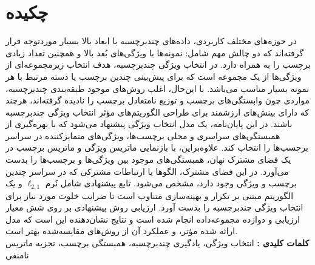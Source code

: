 \thispagestyle{empty}
\BZarboldE\section*{چکیده}
\BNazTTN
در حوزه‌های مختلف کاربردی، داده‌های چندبرچسبه با ابعاد بالا بسیار موردتوجه قرار گرفته‌اند که دو چالش مهم شامل: نمونه‌ها با ویژگی‌های بُعد بالا و همچنین تعداد زیادی برچسب را به همراه دارد. در انتخاب ویژگی چندبرچسبه، هدف انتخاب زیرمجموعه‌ای از ویژگی‌ها از یک مجموعه است که برای پیش‌بینی چندین برچسب یا دسته مرتبط با هر نمونه بسیار مناسب می‌باشد. با این‌حال، اغلب روش‌های موجود طبقه‌بندی چندبرچسبه، مواردی چون وابستگی‌های برچسب و توزیع نامتعادل برچسب را نادیده گرفته‌اند، هرچند که دارای بینش‌های ارزشمند برای طراحی الگوریتم‌های مؤثر انتخاب ویژگی چندبرچسبه باشند.
در این پایان‌نامه، یک مدل انتخاب ویژگی پیشنهاد می‌شود که با بهره‌گیری از همبستگی‌های سراسری و محلی برچسب‌ها، ویژگی‌های متمایزکننده در سراسر برچسب‌ها را انتخاب ‌کند. علاوه‌بر‌این، با بازنمایی ماتریس ویژگی و ماتریس برچسب در یک فضای مشترک نهان، همبستگی‌های موجود بین ویژگی‌ها و برچسب‌ها را بدست می‌آورد. در این فضای مشترک، الگوها یا ارتباطات مشترکی که در سراسر چندین ‌برچسب و ویژگی وجود دارد، مشخص می‌شود. تابع پیشنهادی شامل نُرم $\ell_{2,1} $ و یک الگوریتم مبتنی بر تکرار و بهینه‌سازی متناوب ‌است تا ضرایب خلوت مورد نیاز برای انتخاب ویژگی چندبرچسبه را بدست آورد. 
ارزیابی روش پیشنهادی بر روی شش معیار ارزیابی و دوازده مجموعه‌داده انجام شده است و نتایج نشان‌دهنده این است که مدل ارائه شده مؤثر، و عملکرد آن از روش‌های مقایسه‌شده بهتر است. \\
\textbf{کلمات کلیدی :}
انتخاب ویژگی، یادگیری چندبرچسبه، همبستگی برچسب، تجزیه ماتریس نامنفی